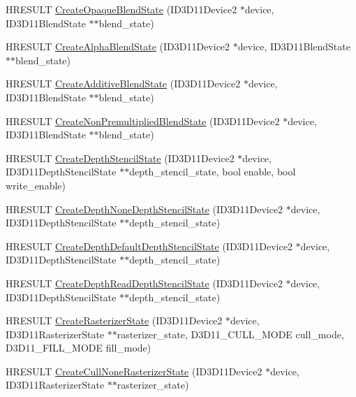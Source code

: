 \begin{DoxyCompactItemize}
H\+R\+E\+S\+U\+LT \hyperlink{namespacemage_ab2f30a0ab5f75edd279091ee24bc7811}{Create\+Opaque\+Blend\+State} (I\+D3\+D11\+Device2 $\ast$device, I\+D3\+D11\+Blend\+State $\ast$$\ast$blend\+\_\+state)
\item 
H\+R\+E\+S\+U\+LT \hyperlink{namespacemage_a334c4403848e086f84b328883ff387cc}{Create\+Alpha\+Blend\+State} (I\+D3\+D11\+Device2 $\ast$device, I\+D3\+D11\+Blend\+State $\ast$$\ast$blend\+\_\+state)
\item 
H\+R\+E\+S\+U\+LT \hyperlink{namespacemage_a5c813464cd190784dec2d505d3254917}{Create\+Additive\+Blend\+State} (I\+D3\+D11\+Device2 $\ast$device, I\+D3\+D11\+Blend\+State $\ast$$\ast$blend\+\_\+state)
\item 
H\+R\+E\+S\+U\+LT \hyperlink{namespacemage_a6f4e37e4b8092acec9dad9a8b24ebb07}{Create\+Non\+Premultiplied\+Blend\+State} (I\+D3\+D11\+Device2 $\ast$device, I\+D3\+D11\+Blend\+State $\ast$$\ast$blend\+\_\+state)
\item 
H\+R\+E\+S\+U\+LT \hyperlink{namespacemage_a8821b7d9587082504cb1f4d04e53ff05}{Create\+Depth\+Stencil\+State} (I\+D3\+D11\+Device2 $\ast$device, I\+D3\+D11\+Depth\+Stencil\+State $\ast$$\ast$depth\+\_\+stencil\+\_\+state, bool enable, bool write\+\_\+enable)
\item 
H\+R\+E\+S\+U\+LT \hyperlink{namespacemage_ab1edddad5787ae095bc03f1cf5c54564}{Create\+Depth\+None\+Depth\+Stencil\+State} (I\+D3\+D11\+Device2 $\ast$device, I\+D3\+D11\+Depth\+Stencil\+State $\ast$$\ast$depth\+\_\+stencil\+\_\+state)
\item 
H\+R\+E\+S\+U\+LT \hyperlink{namespacemage_adc620b251acd7cb9c4b5f905607ceee5}{Create\+Depth\+Default\+Depth\+Stencil\+State} (I\+D3\+D11\+Device2 $\ast$device, I\+D3\+D11\+Depth\+Stencil\+State $\ast$$\ast$depth\+\_\+stencil\+\_\+state)
\item 
H\+R\+E\+S\+U\+LT \hyperlink{namespacemage_a56b331ac7866106016040e4ebce50790}{Create\+Depth\+Read\+Depth\+Stencil\+State} (I\+D3\+D11\+Device2 $\ast$device, I\+D3\+D11\+Depth\+Stencil\+State $\ast$$\ast$depth\+\_\+stencil\+\_\+state)
\item 
H\+R\+E\+S\+U\+LT \hyperlink{namespacemage_a801f8c5a484129ae6717733de626b625}{Create\+Rasterizer\+State} (I\+D3\+D11\+Device2 $\ast$device, I\+D3\+D11\+Rasterizer\+State $\ast$$\ast$rasterizer\+\_\+state, D3\+D11\+\_\+\+C\+U\+L\+L\+\_\+\+M\+O\+DE cull\+\_\+mode, D3\+D11\+\_\+\+F\+I\+L\+L\+\_\+\+M\+O\+DE fill\+\_\+mode)
\item 
H\+R\+E\+S\+U\+LT \hyperlink{namespacemage_a7583853c115c9c5cecb583fa61157c25}{Create\+Cull\+None\+Rasterizer\+State} (I\+D3\+D11\+Device2 $\ast$device, I\+D3\+D11\+Rasterizer\+State $\ast$$\ast$rasterizer\+\_\+state)

\end{DoxyCompactItemize}
